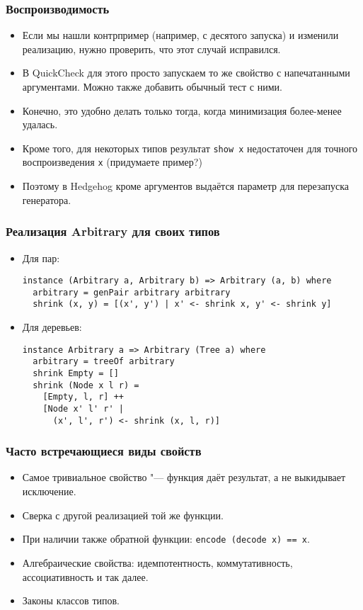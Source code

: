 \documentclass[11pt]{beamer}
\begin{document}
\begin{frame}[fragile]
\frametitle{Воспроизводимость}
\begin{itemize}
    \item Если мы нашли контрпример (например, с десятого запуска) и изменили реализацию, нужно проверить, что этот случай исправился.
    \item В QuickCheck для этого просто запускаем то же свойство с напечатанными аргументами. Можно также добавить обычный тест с ними.
    \item Конечно, это удобно делать только тогда, когда минимизация более-менее удалась.
    \item Кроме того, для некоторых типов результат \lstinline|show x| недостаточен для точного воспроизведения \lstinline|x| (придумаете пример?)
    \item Поэтому в Hedgehog кроме аргументов выдаётся параметр для перезапуска генератора. 
\end{itemize}
\end{frame}

\begin{frame}[fragile]
\frametitle{Реализация Arbitrary для своих типов}
\begin{itemize}
    \item Для пар:
\begin{lstlisting}[basicstyle=\ttfamily\small]
instance (Arbitrary a, Arbitrary b) => Arbitrary (a, b) where
  arbitrary = genPair arbitrary arbitrary
  shrink (x, y) = [(x', y') | x' <- shrink x, y' <- shrink y]
\end{lstlisting}
    \item Для деревьев: 
\begin{lstlisting}[basicstyle=\ttfamily\small]
instance Arbitrary a => Arbitrary (Tree a) where
  arbitrary = treeOf arbitrary
  shrink Empty = []
  shrink (Node x l r) = 
    [Empty, l, r] ++
    [Node x' l' r' | 
      (x', l', r') <- shrink (x, l, r)]
\end{lstlisting}
\end{itemize}
\end{frame}

\begin{frame}[fragile]
\frametitle{Часто встречающиеся виды свойств}
\begin{itemize}
    \item Самое тривиальное свойство "--- функция даёт результат, а не выкидывает исключение.
    \item Сверка с другой реализацией той же функции.
    \item При наличии также обратной функции: \lstinline|encode (decode x) == x|.
    \item Алгебраические свойства: идемпотентность, коммутативность, ассоциативность и так далее.
    \item Законы классов типов.
\end{itemize}
\end{frame}
\end{document}
